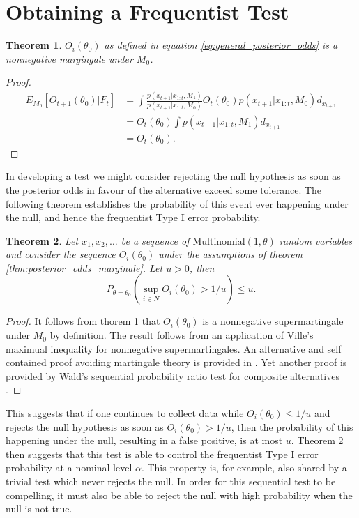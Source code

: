 \documentclass[11pt]{article}
\newtheorem{thm}{Theorem}[section]
\begin{document}
\section{Obtaining a Frequentist Test}
\label{sec:theory}
\begin{thm}
  $O_i(\theta_0)$ as defined in equation \eqref{eq:general_posterior_odds} is a nonnegative margingale under $M_0$.
  \label{thm:posterior_odds_martingale}
    \end{thm}
  \begin{proof}
  \begin{align}
    E_{M_0}[O_{t+1}(\theta_0)|F_{t}]  &= \int \frac{p(x_{t+1}|x_{1:t},M_1)}{p(x_{t+1}|x_{1:t},M_0)} O_{t}(\theta_0) p(x_{t+1}|x_{1:t},M_0) d_{x_{t+1}}\\
    &=  O_{t}(\theta_0) \int p(x_{t+1}|x_{1:t},M_1) d_{x_{t+1}}\\
    &=  O_{t}(\theta_0).
  \end{align}
\end{proof}
In developing a test we might consider rejecting the null hypothesis as soon as the posterior odds in favour of the alternative exceed some tolerance. The following theorem establishes the probability of this event ever happening under the null, and hence the frequentist Type I error probability.
\begin{thm}
  \label{thm:type_1_error}
Let $x_1, x_2,\dots $ be a sequence of $\text{Multinomial}(1,\theta)$ random variables and consider the sequence $O_i(\theta_0)$ under the assumptions of theorem \ref{thm:posterior_odds_marginale}. Let $u >0$, then
\begin{equation}
  P_{\theta = \theta_0}\left( \sup_{i\in N} O_i(\theta_0) > 1/u \right) \leq u.
\end{equation}
\end{thm}
\begin{proof}
It follows from thorem \ref{thm:posterior_odds_martingale} that $O_i(\theta_0)$ is a nonnegative supermartingale under $M_0$ by definition. The result follows from an application of Ville's maximual inequality for nonnegative supermartingales. An alternative and self contained proof avoiding martingale theory is provided in \cite{robbins}. Yet another proof is provided by Wald's sequential probability ratio test for composite alternatives \cite{wald}.
\end{proof}
This suggests that if one continues to collect data while $O_i(\theta_0) \leq 1/u$ and rejects the null hypothesis as soon as $O_i(\theta_0) > 1/u$, then the probability of this happening under the null, resulting in a false positive, is at most $u$. Theorem \ref{thm:type_1_error} then suggests that this test is able to control the frequentist Type I error probability at a nominal level $\alpha$. This property is, for example, also shared by a trivial test which never rejects the null. In order for this sequential test to be compelling, it must also be able to reject the null with high probability when the null is not true.
\end{document}
